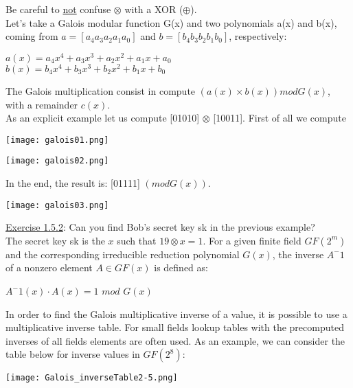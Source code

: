 \documentclass{article}
\begin{document}
Be careful to \underline{not} confuse $\otimes$ with a XOR ($\oplus$).\\

Let's take a Galois modular function G(x) and two polynomials a(x) and b(x), coming from $a=[a_4 a_3 a_2 a_1 a_0]$ and $b=[b_4 b_3 b_2 b_1 b_0]$, respectively:

\begin{center}
    $a(x) = a_4 x^4 + a_3 x^3 + a_2 x^2 + a_1 x + a_0$ \\
    $b(x) = b_4 x^4 + b_3 x^3 + b_2 x^2 + b_1 x + b_0$
\end{center}

The Galois multiplication consist in compute $(a(x) \times b(x)) mod G(x)$, with a remainder $c(x)$.\\
As an explicit example let us compute [01010] $\otimes$ [10011]. First of all we compute 

\begin{center}
\texttt{[image: galois01.png]}
\end{center}

\begin{center}
\texttt{[image: galois02.png]}\\
\end{center}

In the end, the result is: [01111] $(mod G(x))$.

\begin{center}
\texttt{[image: galois03.png]}
\end{center}

\underline{Exercise 1.5.2}: Can you find Bob's secret key sk in the previous example?\\
The secret key sk is the $x$ such that $19 \otimes x = 1$. For a given finite field $GF(2^m)$ and the corresponding irreducible reduction polynomial $G(x)$, the inverse $A^-1$ of a nonzero element $A \in GF(x)$ is defined as:
\begin{center}
    $A^-1(x) \cdot A(x) = 1 $ $mod$ $G(x)$
\end{center}
In order to find the Galois multiplicative inverse of a value, it is possible to use a multiplicative inverse table. For small fields lookup tables with the precomputed inverses of all fields elements are often used. As an example, we can consider the table below for inverse values in $GF(2^8)$:

\begin{flushleft}
\texttt{[image: Galois\_inverseTable2-5.png]}
\end{flushleft}
\end{document}
